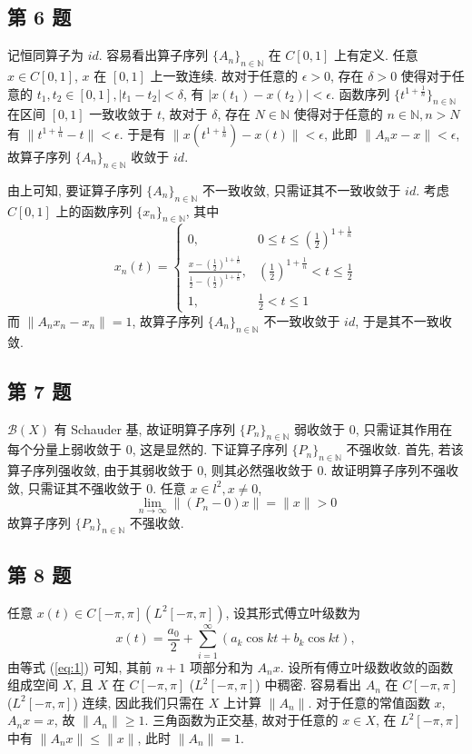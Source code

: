 \documentclass[../main.tex]{subfiles}
\begin{document}
\subsection{第 6 题}
记恒同算子为 $id$.
容易看出算子序列 $\{ A_{n} \}_{n \in \mathbb{N}}$ 在 $C[0, 1]$ 上有定义.
任意 $x \in C[0, 1]$, $x$ 在 $[0,1]$ 上一致连续.
故对于任意的 $\epsilon > 0$,
存在 $\delta > 0$ 使得对于任意的 $t_1, t_2 \in [0, 1], | t_1 - t_2| < \delta$,
有 $| x(t_1) - x(t_2) | < \epsilon$.
函数序列 $\{ t^{1 + \frac{1}{n}} \}_{n \in \mathbb{N}}$ 在区间 $[0, 1]$ 一致收敛于 $t$,
故对于 $\delta$, 存在 $N \in \mathbb{N}$ 使得对于任意的 $n \in \mathbb{N}, n > N$ 有 $\| t^{1 + \frac{1}{n}} - t \| < \epsilon$.
于是有 $\| x(t^{1 + \frac{1}{n}}) - x(t) \| < \epsilon$,
此即 $\| A_n x - x \| < \epsilon$, 故算子序列 $\{ A_{n} \}_{n \in \mathbb{N}}$ 收敛于 $id$.

由上可知, 要证算子序列 $\{ A_{n} \}_{n \in \mathbb{N}}$ 不一致收敛, 只需证其不一致收敛于 $id$.
考虑 $C[0, 1]$ 上的函数序列 $\{ x_{n} \}_{n \in \mathbb{N}}$, 其中
\[
    x_n(t) = \begin{cases}
        0, & 0 \leqslant t \leqslant \left( \frac{1}{2} \right)^{1 + \frac{1}{n}} \\
        \frac{x - \left( \frac{1}{2} \right)^{1 + \frac{1}{n}}}{\frac{1}{2} - \left( \frac{1}{2} \right)^{1 + \frac{1}{n}}}, & \left( \frac{1}{2} \right)^{1 + \frac{1}{n}} < t \leqslant \frac{1}{2} \\
        1, & \frac{1}{2} < t \leqslant 1
    \end{cases}
\]
而 $\| A_n x_n - x_n \| = 1$, 故算子序列 $\{ A_{n} \}_{n \in \mathbb{N}}$ 不一致收敛于 $id$, 于是其不一致收敛.

\subsection{第 7 题}
$\mathscr{B}(X)$ 有 Schauder 基, 故证明算子序列 $\{ P_{n} \}_{n \in \mathbb{N}}$ 弱收敛于 $0$, 只需证其作用在每个分量上弱收敛于 $0$, 这是显然的.
下证算子序列 $\{ P_{n} \}_{n \in \mathbb{N}}$ 不强收敛.
首先, 若该算子序列强收敛, 由于其弱收敛于 $0$, 则其必然强收敛于 $0$.
故证明算子序列不强收敛, 只需证其不强收敛于 $0$.
任意 $x \in l^2, x \neq 0$,
\[
    \lim_{n \to \infty} \| (P_n - 0) x \| = \| x \| > 0
\]
故算子序列 $\{ P_{n} \}_{n \in \mathbb{N}}$ 不强收敛.


\subsection{第 8 题}
任意 $x(t) \in C[-\pi, \pi] (L^2[-\pi, \pi])$, 设其形式傅立叶级数为
\[
    x(t) = \frac{a_0}{2} + \sum_{i = 1}^{\infty}(a_k \cos{kt} + b_k \cos{kt}),
\]
由等式 (\ref{eq:1}) 可知, 其前 $n + 1$ 项部分和为 $A_n x$.
设所有傅立叶级数收敛的函数组成空间 $X$, 且 $X$ 在 $C[-\pi, \pi]$ ($L^2[-\pi, \pi]$) 中稠密.
容易看出 $A_n$ 在 $C[-\pi, \pi]$ ($L^2[-\pi, \pi]$) 连续, 因此我们只需在 $X$ 上计算 $\| A_n \|$.
对于任意的常值函数 $x$, $A_n x = x$, 故 $\| A_n \| \geqslant 1$.
三角函数为正交基, 故对于任意的 $x \in X$,
在 $L^2[-\pi, \pi]$ 中有 $\| A_n x \| \leqslant \| x \|$, 此时 $\| A_n \| = 1$.
\end{document}
